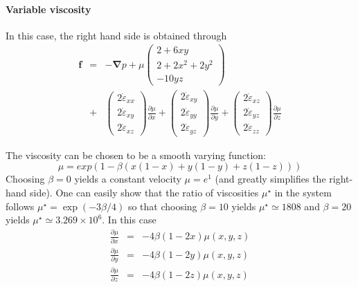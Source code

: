 \paragraph{Variable viscosity}

In this case, the right hand side is obtained through
\begin{eqnarray}
{\bm f} &=& -{\bm \nabla p} + 
\mu
\left(
\begin{array}{c}
2+6xy \\
2+2x^2+2y^2 \\
-10yz
\end{array}
\right) \nonumber\\
&+&
\left(
\begin{array}{c}
2 \dot{\varepsilon}_{xx} \\
2 \dot{\varepsilon}_{xy} \\
2 \dot{\varepsilon}_{xz}
\end{array}
\right) \frac{\partial \mu}{\partial x}
+
\left(
\begin{array}{c}
2 \dot{\varepsilon}_{xy} \\
2 \dot{\varepsilon}_{yy} \\
2 \dot{\varepsilon}_{yz}
\end{array}
\right) \frac{\partial \mu}{\partial y}
+
\left(
\begin{array}{c}
2 \dot{\varepsilon}_{xz} \\
2 \dot{\varepsilon}_{yz} \\
2 \dot{\varepsilon}_{zz} 
\end{array}
\right) \frac{\partial \mu}{\partial z}
\end{eqnarray}


The viscosity can be chosen to be a smooth varying function:
\begin{equation}
\mu = exp(1 - \beta(x(1 - x) + y(1 - y) + z(1 - z)))
\end{equation}
Choosing $\beta=0$ yields a constant velocity $\mu=e^1$ (and greatly simplifies the right-hand side).
One can easily show that the ratio of viscosities $\mu^\star$
in the system follows $\mu^\star=\exp(-3\beta/4)$ so that choosing $\beta=10$ yields
$\mu^\star\simeq 1808$ and $\beta=20$ yields $\mu^\star\simeq 3.269\times10^6$.
In this case
\begin{eqnarray}
\frac{\partial \mu}{\partial x}&=&-4\beta(1-2x)\mu(x,y,z)\\
\frac{\partial \mu}{\partial y}&=&-4\beta(1-2y)\mu(x,y,z)\\
\frac{\partial \mu}{\partial z}&=&-4\beta(1-2z)\mu(x,y,z)
\end{eqnarray}


